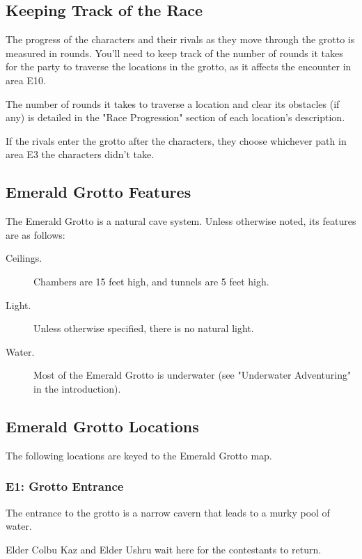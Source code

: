 \documentclass[10pt,a4paper,twoside,bg=print,twocolumn,openany,nodeprecatedcode]{dndbook}
\begin{document}
\subsection{Keeping Track of the Race}
The progress of the characters and their rivals as they move through the grotto is measured in rounds. You'll need to keep track of the number of rounds it takes for the party to traverse the locations in the grotto, as it affects the encounter in area E10.

The number of rounds it takes to traverse a location and clear its obstacles (if any) is detailed in the "Race Progression" section of each location's description.

If the rivals enter the grotto after the characters, they choose whichever path in area E3 the characters didn't take.

\subsection{Emerald Grotto Features}
The Emerald Grotto is a natural cave system. Unless otherwise noted, its features are as follows:


\begin{description}
\item[Ceilings.]
Chambers are 15 feet high, and tunnels are 5 feet high.
\item[Light.]
Unless otherwise specified, there is no natural light.
\item[Water.]
Most of the Emerald Grotto is underwater (see "Underwater Adventuring" in the introduction).
\end{description}

\subsection{Emerald Grotto Locations}
The following locations are keyed to the Emerald Grotto map.

\subsubsection{E1: Grotto Entrance}
\begin{DndReadAloud}{}
The entrance to the grotto is a narrow cavern that leads to a murky pool of water.

\end{DndReadAloud}

Elder Colbu Kaz and Elder Ushru wait here for the contestants to return.
\end{document}
